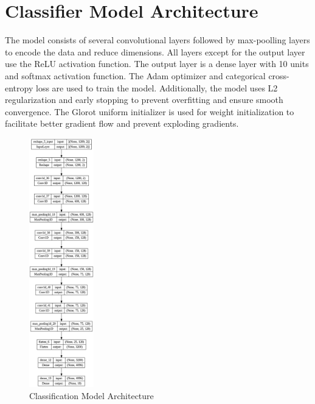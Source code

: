 \section{Classifier Model Architecture}
The model consists of several convolutional layers followed by max-poolling layers to encode the data and reduce dimensions. All layers except for the output layer use the ReLU activation function. The output layer is a dense layer with 10 units and softmax activation function. The Adam optimizer and categorical cross-entropy loss are used to train the model. Additionally, the model uses L2 regularization and early stopping to prevent overfitting and ensure smooth convergence. The Glorot uniform initializer is used for weight initialization to facilitate better gradient flow and prevent exploding gradients. 
\begin{figure}[!h]
  \centering
    \includegraphics[width=0.25\textwidth]{figures/model_architecture.png}
    \caption{Classification Model Architecture}
    \label{model_arch}
\end{figure}
